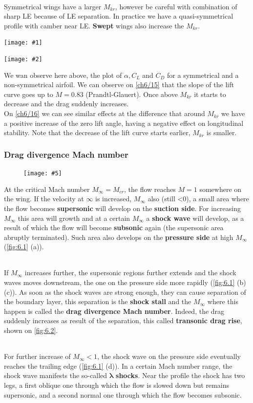 \documentclass[british,french,11pt, a4paper, openany]{article}
\newcommand{\wrapfig}[6]{%
	\begin{figure}%
		\vspace{-5mm}%
		\texttt{[image: \#5]}%
		\captionof{figure}{}%
		\label{#6}%
	\end{figure}%
}
\newcommand{\minifig}[6]{
	\begin{center}%
		\begin{minipage}{#5\textwidth}%
			\texttt{[image: \#1]}%
			\captionof{figure}{}%
			\label{#1}%
		\end{minipage}%
		\begin{minipage}{#6\textwidth}%
			\texttt{[image: \#2]}%
			\captionof{figure}{}%
			\label{#2}%
		\end{minipage}%
	\end{center}
}
\begin{document}
\ \\ Symmetrical wings have a larger $M_{kr}$, however be careful with combination of sharp LE because of LE separation. In practice we have a quasi-symmetrical profile with camber near LE. \textbf{Swept} wings also increase the $M_{kr}$. 

\minifig{ch6/15}{ch6/16}{0.2}{0.15}{0.45}{0.3}

We wan observe here above, the plot of $\alpha, C_L$ and $C_D$ for a symmetrical and a non-symmetrical airfoil. We can observe on \autoref{ch6/15} that the slope of the lift curve goes up to $M=0.83$ (Prandtl-Glauert). Once above $M_{kr}$ it starts to decrease and the drag suddenly increases. \\

On \autoref{ch6/16} we can see similar effects at the difference that around $M_{kr}$ we have a positive increase of the zero lift angle, having a negative effect on longitudinal stability. Note that the decrease of the lift curve starts earlier, $M_{kr}$ is smaller. 

\subsubsection{Drag divergence Mach number}
\wrapfig{22}{l}{4.5}{0.2}{ch6/1}{fig:6.1}
At the critical Mach number $M_\infty = M_{cr}$, the flow reaches $M=1$ somewhere on the wing. If the velocity at $\infty$ is increased, $M_\infty$ also (still <0), a small area where the flow becomes \textbf{supersonic} will develop on the \textbf{suction side}. For increasing $M_\infty$ this area will growth and at a certain $M_\infty$ a \textbf{shock wave} will develop, as a result of which the flow will become \textbf{subsonic} again (the supersonic area abruptly terminated). Such area also develops on the \textbf{pressure side} at high $M_\infty$ (\autoref{fig:6.1} (a)).

\ \\ If $M_\infty$ increases further, the supersonic regions further extends and the shock waves moves downstream, the one on the pressure side more rapidly (\autoref{fig:6.1} (b) (c)). As soon as the shock waves are strong enough, they can cause separation of the boundary layer, this separation is the \textbf{shock stall} and the $M_\infty$ where this happen is called the \textbf{drag divergence Mach number}. Indeed, the drag suddenly increases as result of the separation, this called \textbf{transonic drag rise}, shown on \autoref{fig:6.2}. 

\ \\ For further increase of $M_\infty <1$, the shock wave on the pressure side eventually reaches the trailing edge (\autoref{fig:6.1} (d)). In a certain Mach number range, the shock wave manifests the so-called $\bm{\lambda}$ \textbf{shocks}. Near the profile the shock has two legs, a first oblique one through which the flow is slowed down but remains supersonic, and a second normal one through which the flow becomes subsonic. 
\end{document}
